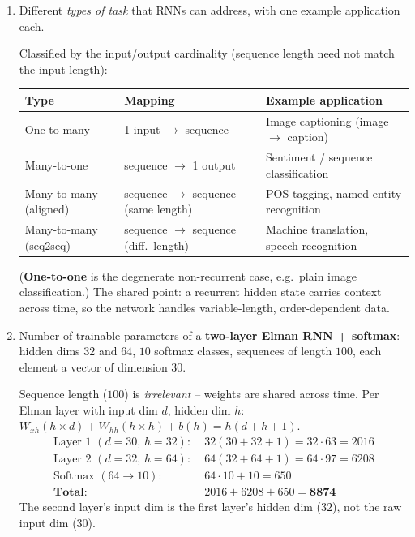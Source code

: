 \documentclass[10pt,a4paper]{article}
\newcommand{\q}[1]{\item #1}
\begin{document}
\begin{enumerate}[leftmargin=*,label=\textbf{Q\arabic*.}]
\q Different \emph{types of task} that RNNs can address, with one example application each.
\begin{answerbox}
Classified by the input/output cardinality (sequence length need not match the input length):
\begin{center}
\begin{tabular}{@{}lll@{}}
\toprule
\textbf{Type} & \textbf{Mapping} & \textbf{Example application} \\
\midrule
One-to-many  & 1 input $\to$ sequence      & Image captioning (image $\to$ caption) \\
Many-to-one  & sequence $\to$ 1 output     & Sentiment / sequence classification \\
Many-to-many (aligned) & sequence $\to$ sequence (same length) & POS tagging, named-entity recognition \\
Many-to-many (seq2seq) & sequence $\to$ sequence (diff.\ length) & Machine translation, speech recognition \\
\bottomrule
\end{tabular}
\end{center}
(\textbf{One-to-one} is the degenerate non-recurrent case, e.g.\ plain image classification.) The shared point: a recurrent hidden state carries context across time, so the network handles variable-length, order-dependent data.
\end{answerbox}

\q Number of trainable parameters of a \textbf{two-layer Elman RNN + softmax}: hidden dims $32$ and $64$, $10$ softmax classes, sequences of length $100$, each element a vector of dimension $30$.
\begin{answerbox}
Sequence length ($100$) is \emph{irrelevant} -- weights are shared across time. Per Elman layer with input dim $d$, hidden dim $h$: $W_{xh}(h{\times}d)+W_{hh}(h{\times}h)+b(h)=h(d+h+1)$.
\[
\begin{aligned}
\text{Layer 1 } (d{=}30,\,h{=}32):\;& 32(30+32+1)=32\cdot 63 = 2016\\
\text{Layer 2 } (d{=}32,\,h{=}64):\;& 64(32+64+1)=64\cdot 97 = 6208\\
\text{Softmax } (64\to 10):\;& 64\cdot 10 + 10 = 650\\
\hline
\textbf{Total}:\;& 2016+6208+650 = \mathbf{8874}
\end{aligned}
\]
The second layer's input dim is the first layer's hidden dim ($32$), not the raw input dim ($30$).
\end{answerbox}


\end{enumerate}
\end{document}
